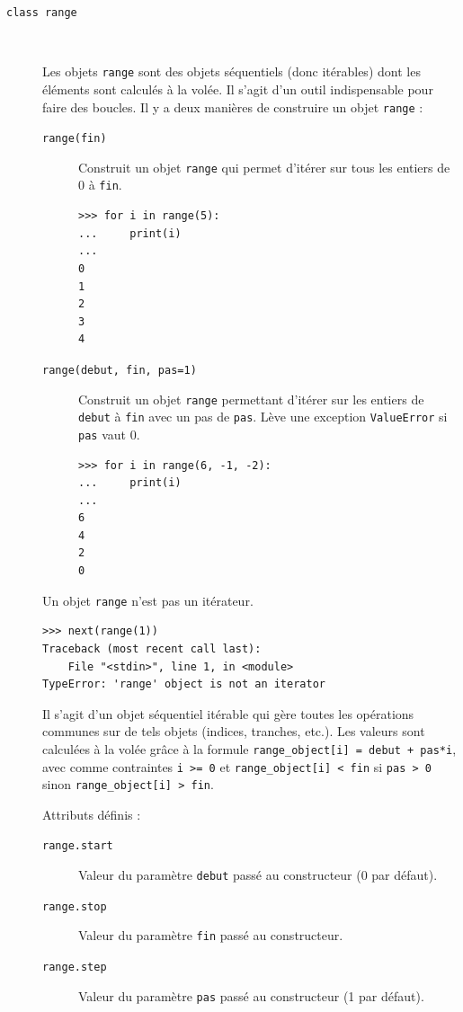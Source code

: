 \documentclass[a4paper, 10pt]{article}
\begin{document}
\begin{description}
    \item[\texttt{class range}]~
    
    Les objets \texttt{range} sont des objets séquentiels (donc itérables) dont les éléments sont
    calculés à la volée. Il s'agit d'un outil indispensable pour faire des boucles. Il y a deux manières de construire un objet \texttt{range} :

    \begin{description}
        \item[\texttt{range(fin)}] Construit un objet \texttt{range} qui permet d'itérer sur tous les entiers de 0 à \texttt{fin}.
            \begin{verbatim}
>>> for i in range(5):
...     print(i)
...
0
1
2
3
4
            \end{verbatim}
        \item[\texttt{range(debut, fin, pas=1)}] Construit un objet \texttt{range} permettant d'itérer sur les entiers de \texttt{debut} à \texttt{fin} avec un pas de \texttt{pas}. Lève une exception \texttt{ValueError} si \texttt{pas} vaut 0.
        \begin{verbatim}
>>> for i in range(6, -1, -2):
...     print(i)
...
6
4
2
0
        \end{verbatim} 
    \end{description}

    Un objet \texttt{range} n'est pas un itérateur.

    \begin{verbatim}
>>> next(range(1))
Traceback (most recent call last):
    File "<stdin>", line 1, in <module>
TypeError: 'range' object is not an iterator
    \end{verbatim}

    Il s'agit d'un objet séquentiel itérable qui gère toutes les opérations communes sur de tels objets (indices, tranches, etc.). Les valeurs sont calculées à la volée grâce à la formule \texttt{range_object[i] = debut + pas*i}, avec comme contraintes \texttt{i >= 0} et \texttt{range_object[i] < fin} si \texttt{pas > 0} sinon \texttt{range_object[i] > fin}.

    Attributs définis :
    \begin{description}
        \item[\texttt{range.start}] Valeur du paramètre \texttt{debut} passé au constructeur (0 par défaut).
        \item[\texttt{range.stop}] Valeur du paramètre \texttt{fin} passé au constructeur.
        \item[\texttt{range.step}] Valeur du paramètre \texttt{pas} passé au constructeur (1 par défaut).
    \end{description}



\end{description}
\end{document}
